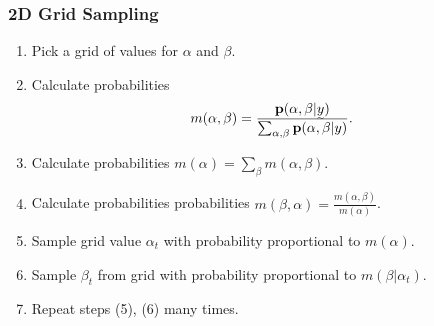 \subsubsection{2D Grid Sampling}

\begin{enumerate}[(1)]
    \item Pick a grid of values for $\alpha$ and $\beta$.
    \item Calculate probabilities
    \[
    m(\alpha, \beta) = \frac{\p(\alpha, \beta| \vec{y})}{\sum_{\alpha, \beta} \p(\alpha, \beta| y)}.
    \]
    \item Calculate probabilities $m(\alpha) = \sum_{\beta}m(\alpha, \beta)$.
    \item Calculate probabilities probabilities $m(\beta, \alpha) = \frac{m(\alpha, \beta)}{m(\alpha)}$.
    \item Sample grid value $\alpha_t$ with probability proportional to $m(\alpha)$.
    \item Sample $\beta_t$ from grid with probability proportional to $m(\beta|\alpha_t)$.
    \item Repeat steps (5), (6) many times.
\end{enumerate}